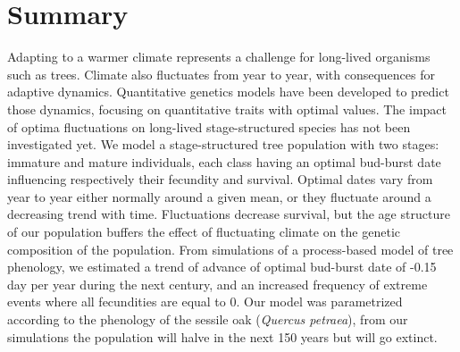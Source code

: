 \section*{Summary}

Adapting to a warmer climate represents a challenge for long-lived organisms such as trees. Climate also fluctuates from year to year, with consequences for adaptive dynamics. Quantitative genetics models have been developed to predict those dynamics, focusing on quantitative traits with optimal values. The impact of optima fluctuations on long-lived  stage-structured species has not been investigated yet.
We model a stage-structured tree population with two stages: immature and mature individuals, each class having an optimal bud-burst date influencing respectively their fecundity and survival. Optimal dates vary from year to year either normally around a given mean, or they fluctuate around a decreasing trend with time.
Fluctuations decrease survival, but the age structure of our population buffers the effect of fluctuating climate on the genetic composition of the population. From simulations of a process-based model of tree phenology, we estimated a trend of advance of optimal bud-burst date of -0.15 day per year during the next century, and an increased frequency of extreme events where all fecundities are equal to 0. Our model was parametrized according to the phenology of the sessile oak (\textit{Quercus petraea}), from our simulations the population will halve in the next 150 years but will go extinct.